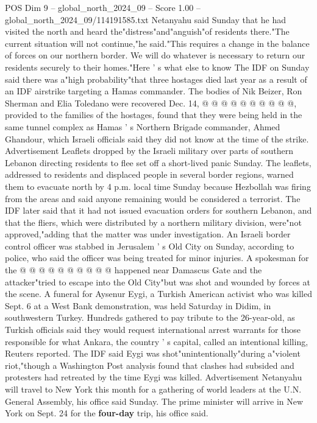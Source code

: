 \begin{textsample}{POS Dim 9 – global\_north\_2024\_09 – Score 1.00 – global\_north\_2024\_09/114191585.txt}
Netanyahu said Sunday that he had visited the north and heard the"distress"and"anguish"of residents there."The current situation will not continue,"he said."This requires a change in the balance of forces on our northern border.
We will do whatever is necessary to return our residents securely to their homes."Here ' s what else to know The IDF on Sunday said there was a"high probability"that three hostages died last year as a result of an IDF airstrike targeting a Hamas commander.
The bodies of Nik Beizer, Ron Sherman and Elia Toledano were recovered Dec. 14, @ @ @ @ @ @ @ @ @ @, provided to the families of the hostages, found that they were being held in the same tunnel complex as Hamas ' s Northern Brigade commander, Ahmed Ghandour, which Israeli officials said they did not know at the time of the strike.
Advertisement Leaflets dropped by the Israeli military over parts of southern Lebanon directing residents to flee set off a short-lived panic Sunday.
The leaflets, addressed to residents and displaced people in several border regions, warned them to evacuate north by 4 p.m. local time Sunday because Hezbollah was firing from the areas and said anyone remaining would be considered a terrorist.
The IDF later said that it had not issued evacuation orders for southern Lebanon, and that the fliers, which were distributed by a northern military division, were"not approved,"adding that the matter was under investigation.
An Israeli border control officer was stabbed in Jerusalem ' s Old City on Sunday, according to police, who said the officer was being treated for minor injuries.
A spokesman for the @ @ @ @ @ @ @ @ @ @ happened near Damascus Gate and the attacker"tried to escape into the Old City"but was shot and wounded by forces at the scene.
A funeral for Aysenur Eygi, a Turkish American activist who was killed Sept. 6 at a West Bank demonstration, was held Saturday in Didim, in southwestern Turkey.
Hundreds gathered to pay tribute to the 26-year-old, as Turkish officials said they would request international arrest warrants for those responsible for what Ankara, the country ' s capital, called an intentional killing, Reuters reported.
The IDF said Eygi was shot"unintentionally"during a"violent riot,"though a Washington Post analysis found that clashes had subsided and protesters had retreated by the time Eygi was killed.
Advertisement Netanyahu will travel to New York this month for a gathering of world leaders at the U.N.
General Assembly, his office said Sunday.
The prime minister will arrive in New York on Sept. 24 for the \textbf{four-day} trip, his office said.

\end{textsample}
